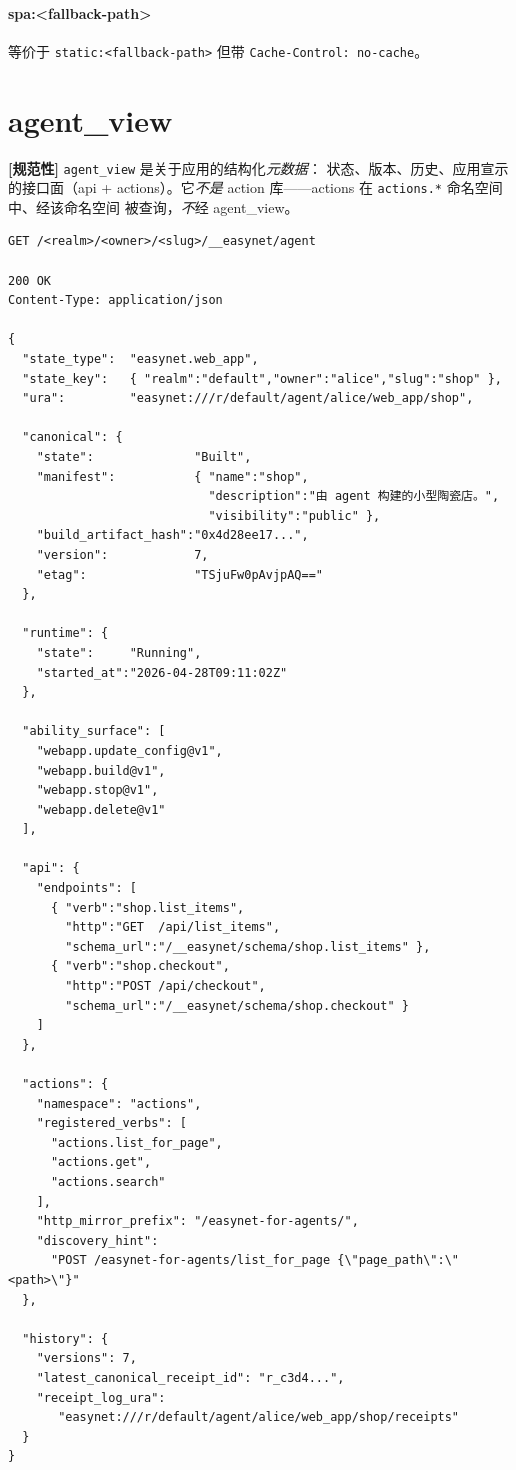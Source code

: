 \documentclass[11pt,a4paper]{article}
\newcommand{\normsv}{\textcolor{normativecolor}{\textbf{[规范性]}}\xspace}
\theoremstyle{definition}
\begin{document}
\paragraph{spa:<fallback-path>} 等价于 \texttt{static:<fallback-path>}
但带 \texttt{Cache-Control: no-cache}。

\section{agent\_view}
\label{sec:agent-view}

\normsv{} \texttt{agent\_view} 是关于应用的结构化\emph{元数据}：
状态、版本、历史、应用宣示的接口面（api + actions）。它\emph{不是}
action 库——actions 在 \texttt{actions.*} 命名空间中、经该命名空间
被查询，\emph{不}经 agent\_view。

\begin{lstlisting}
GET /<realm>/<owner>/<slug>/__easynet/agent

200 OK
Content-Type: application/json

{
  "state_type":  "easynet.web_app",
  "state_key":   { "realm":"default","owner":"alice","slug":"shop" },
  "ura":         "easynet:///r/default/agent/alice/web_app/shop",

  "canonical": {
    "state":              "Built",
    "manifest":           { "name":"shop",
                            "description":"由 agent 构建的小型陶瓷店。",
                            "visibility":"public" },
    "build_artifact_hash":"0x4d28ee17...",
    "version":            7,
    "etag":               "TSjuFw0pAvjpAQ=="
  },

  "runtime": {
    "state":     "Running",
    "started_at":"2026-04-28T09:11:02Z"
  },

  "ability_surface": [
    "webapp.update_config@v1",
    "webapp.build@v1",
    "webapp.stop@v1",
    "webapp.delete@v1"
  ],

  "api": {
    "endpoints": [
      { "verb":"shop.list_items",
        "http":"GET  /api/list_items",
        "schema_url":"/__easynet/schema/shop.list_items" },
      { "verb":"shop.checkout",
        "http":"POST /api/checkout",
        "schema_url":"/__easynet/schema/shop.checkout" }
    ]
  },

  "actions": {
    "namespace": "actions",
    "registered_verbs": [
      "actions.list_for_page",
      "actions.get",
      "actions.search"
    ],
    "http_mirror_prefix": "/easynet-for-agents/",
    "discovery_hint":
      "POST /easynet-for-agents/list_for_page {\"page_path\":\"<path>\"}"
  },

  "history": {
    "versions": 7,
    "latest_canonical_receipt_id": "r_c3d4...",
    "receipt_log_ura":
       "easynet:///r/default/agent/alice/web_app/shop/receipts"
  }
}
\end{lstlisting}
\end{document}
